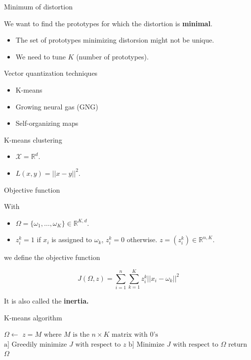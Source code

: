 \documentclass[usenames,dvipsnames]{beamer}
\begin{document}
\begin{frame}{Minimum of distortion}

    We want to find the prototypes for which the distortion is \textbf{{minimal}}. 

    \begin{itemize}
        \item The set of prototypes minimizing distorsion might not be unique.
	\item We need to tune $K$ (number of prototypes).
    \end{itemize}
\end{frame}

\begin{frame}{Vector quantization techniques}
\begin{itemize}
    \item K-means
    \item Growing neural gas (GNG)
    \item Self-organizing maps
\end{itemize}
\end{frame}

\begin{frame}{K-means clustering}
    \begin{itemize}
        \item $\mathcal{X}  = \mathbb{R}^d$.
	\item $ L(x, y) = ||x-y||^2$.
    \end{itemize}
\end{frame}

\begin{frame}{Objective function}

With
\begin{itemize}
    \item $\Omega = \{\omega_1, \dots, \omega_K\}\in \mathbb{R}^{K, d}$.
    \item $z_i^k=1 $ if $x_i$ is assigned to $ \omega_k$, $z_i^k=0$ otherwise. $z= (z_i^k)\in \mathbb{R}^{n, K}$.
\end{itemize}
we define the objective function

\begin{equation}
    J(\Omega, z) = \sum^{n}_{i=1} \sum^{K}_{k=1} z_i^k||x_i-\omega_k||^2
\end{equation}

It is also called the \textbf{{inertia.}} 
    
\end{frame}

\begin{frame}{K-means algorithm}

\begin{algorithm}[H]
	$\Omega\leftarrow $ \;
	$z = M\text{ where } M \text{ is the } n\times K \text{ matrix with 0's}$\;
 	{
	    $\text{a] Greedily minimize }J \text{ with respect to }z$\;
	    $\text{b] Minimize }J \text{ with respect to }\Omega$\;
  	}
  	return $\Omega$
	\caption{K-means (Loyd algorithm)}
\end{algorithm}
\end{frame}
\end{document}
